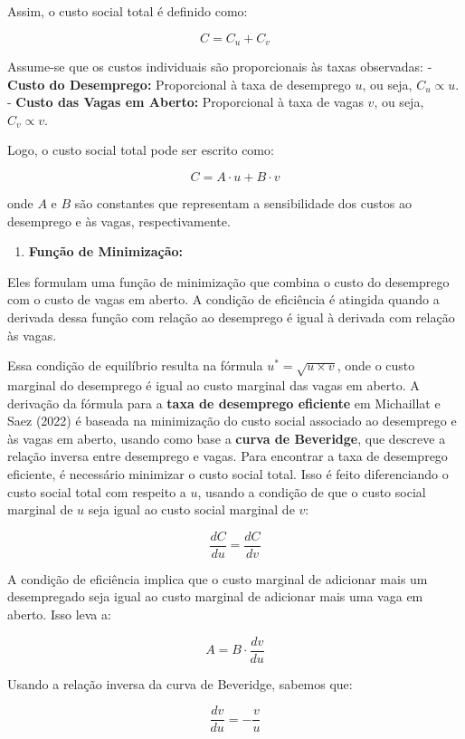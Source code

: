\documentclass[
]{article}
\providecommand{\tightlist}{%
  \setlength{\itemsep}{0pt}\setlength{\parskip}{0pt}}
\begin{document}
Assim, o custo social total é definido como:

\[ C = C_u + C_v \]

Assume-se que os custos individuais são proporcionais às taxas
observadas: - \textbf{Custo do Desemprego:} Proporcional à taxa de
desemprego \(u\), ou seja, \(C_u \propto u\). - \textbf{Custo das Vagas
em Aberto:} Proporcional à taxa de vagas \(v\), ou seja,
\(C_v \propto v\).

Logo, o custo social total pode ser escrito como:

\[ C = A \cdot u + B \cdot v \]

onde \(A\) e \(B\) são constantes que representam a sensibilidade dos
custos ao desemprego e às vagas, respectivamente.

\begin{enumerate}
\def\labelenumi{\alph{enumi}.}
\setcounter{enumi}{2}
\tightlist
\item
  \textbf{Função de Minimização:}
\end{enumerate}

Eles formulam uma função de minimização que combina o custo do
desemprego com o custo de vagas em aberto. A condição de eficiência é
atingida quando a derivada dessa função com relação ao desemprego é
igual à derivada com relação às vagas.

Essa condição de equilíbrio resulta na fórmula
\(u^* = \sqrt{u \times v}\), onde o custo marginal do desemprego é igual
ao custo marginal das vagas em aberto. A derivação da fórmula para a
\textbf{taxa de desemprego eficiente} em Michaillat e Saez (2022) é
baseada na minimização do custo social associado ao desemprego e às
vagas em aberto, usando como base a \textbf{curva de Beveridge}, que
descreve a relação inversa entre desemprego e vagas. Para encontrar a
taxa de desemprego eficiente, é necessário minimizar o custo social
total. Isso é feito diferenciando o custo social total com respeito a
\(u\), usando a condição de que o custo social marginal de \(u\) seja
igual ao custo social marginal de \(v\):

\[
\frac{dC}{du} = \frac{dC}{dv}
\]

A condição de eficiência implica que o custo marginal de adicionar mais
um desempregado seja igual ao custo marginal de adicionar mais uma vaga
em aberto. Isso leva a:

\[
A = B \cdot \frac{dv}{du}
\]

Usando a relação inversa da curva de Beveridge, sabemos que:

\[
\frac{dv}{du} = -\frac{v}{u}
\]
\end{document}
